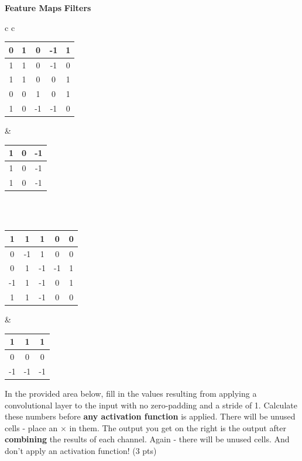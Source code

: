 \begin{center}
	\textbf{Feature Maps} \hspace{2em} \textbf{Filters} \\ %
	\begin{tabular}{c c}
		\begin{tabular}{|c|c|c|c|c|}
			\hline
			0 & 1 & 0  & -1 & 1 \\ \hline
			1 & 1 & 0  & -1 & 0 \\ \hline
			1 & 1 & 0  & 0  & 1 \\ \hline
			0 & 0 & 1  & 0  & 1 \\ \hline
			1 & 0 & -1 & -1 & 0 \\ \hline
		\end{tabular}
		 &                      %
		\begin{tabular}{|c|c|c|}
			\hline
			1 & 0 & -1 \\ \hline
			1 & 0 & -1 \\ \hline
			1 & 0 & -1 \\ \hline
		\end{tabular} \\
		\vspace{2em}            \\ %
		\begin{tabular}{|c|c|c|c|c|}
			\hline
			1  & 1  & 1  & 0  & 0 \\ \hline
			0  & -1 & 1  & 0  & 0 \\ \hline
			0  & 1  & -1 & -1 & 1 \\ \hline
			-1 & 1  & -1 & 0  & 1 \\ \hline
			1  & 1  & -1 & 0  & 0 \\ \hline
		\end{tabular}
		 &                      %
		\begin{tabular}{|c|c|c|}
			\hline
			1  & 1  & 1  \\ \hline
			0  & 0  & 0  \\ \hline
			-1 & -1 & -1 \\ \hline
		\end{tabular}
	\end{tabular}
\end{center}

In the provided area below, fill in the values resulting from applying a convolutional layer to the input with no zero-padding and a stride of 1. Calculate these numbers before \textbf{any activation function} is applied.
There will be unused cells - place an $\times$ in them. The output you get on the right is the output after \textbf{combining} the results of each channel. Again - there will be unused cells. And don't apply an activation function! (3 pts)

